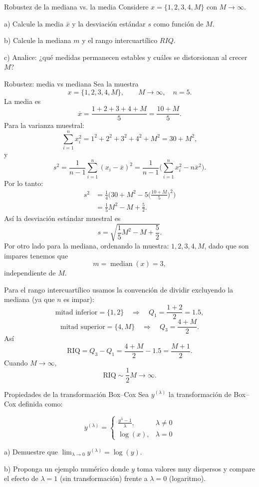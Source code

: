 \documentclass[a4paper,11pt]{article}
\begin{document}
\newpage
\begin{ejercicio}{10}
Robustez de la mediana vs. la media
Considere $x = \{1, 2, 3, 4, M\}$ con $M \rightarrow \infty$.

a) Calcule la media $\bar{x}$ y la desviación estándar $s$ como función de $M$.

b) Calcule la mediana $m$ y el rango intercuartílico $RIQ$.

c) Analice: ¿qué medidas permanecen estables y cuáles se distorsionan al crecer $M$?
\end{ejercicio}
\begin{demostracion}{Robustez: media vs mediana}
Sea la muestra
\[
x=\{1,2,3,4,M\},\qquad M\to\infty,\quad n=5.
\]
La media es
\[
\overline{x}=\frac{1+2+3+4+M}{5}=\frac{10+M}{5}.
\]
Para la varianza muestral:
\[
\sum_{i=1}^n x_i^2 = 1^2+2^2+3^2+4^2+M^2 = 30 + M^2,
\]
y
\[
s^2 = \frac{1}{n-1}\sum_{i=1}^n (x_i-\overline{x})^2
= \frac{1}{n-1}\Big( \sum_{i=1}^n x_i^2 - n\overline{x}^2\Big).
\]
Por lo tanto:
\[
\begin{aligned}
s^2
&= \frac{1}{4}\Big(30+M^2 - 5\Big(\frac{10+M}{5}\Big)^2\Big)\\
&=\frac{1}{5}M^2 - M + \frac{5}{2}.
\end{aligned}
\]
Así la desviación estándar muestral es
\[
s=\sqrt{\frac{1}{5}M^2 - M + \frac{5}{2}}.
\]
Por otro lado para la mediana, ordenando la muestra: \(1,2,3,4,M\), dado que son impares tenemos que 
\[
m=\operatorname{median}(x)=3,
\]
independiente de \(M\).

Para el rango intercuartílico usamos la convención de dividir excluyendo la mediana (ya que \(n\) es impar):
\[
\text{mitad inferior}=\{1,2\}\quad\Rightarrow\quad Q_1=\frac{1+2}{2}=1.5,
\]
\[
\text{mitad superior}=\{4,M\}\quad\Rightarrow\quad Q_3=\frac{4+M}{2}.
\]
Así
\[
\mathrm{RIQ}=Q_3-Q_1=\frac{4+M}{2}-1.5=\frac{M+1}{2}.
\]
Cuando \(M\to\infty\),
\[
\mathrm{RIQ}\sim \frac{1}{2}M \to \infty.
\]



\end{demostracion}

\newpage
\begin{ejercicio}{11}
Propiedades de la transformación Box--Cox
Sea $y^{(\lambda)}$ la transformación de Box--Cox definida como:

\[
y^{(\lambda)} = 
\begin{cases}
\frac{y^\lambda - 1}{\lambda}, & \lambda \neq 0 \\
\log(x), & \lambda = 0
\end{cases}
\]

a) Demuestre que $\lim_{\lambda\to 0} y^{(\lambda)} = \log(y)$.

b) Proponga un ejemplo numérico donde $y$ toma valores muy dispersos y compare el efecto de $\lambda=1$ (sin transformación) frente a $\lambda=0$ (logaritmo).
\end{ejercicio}
\end{document}

